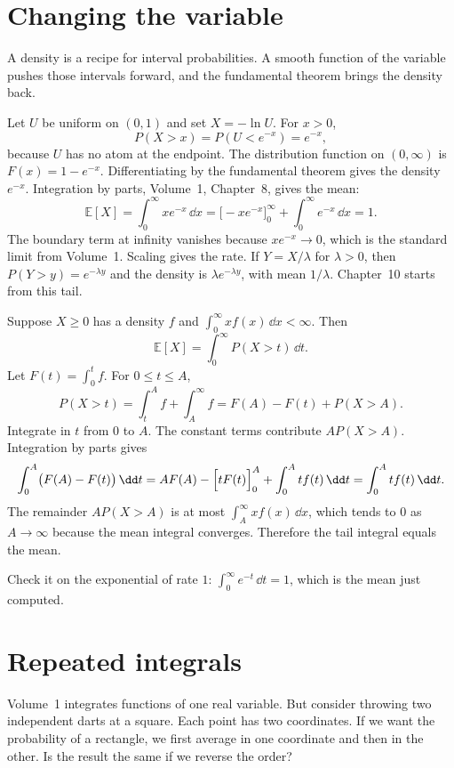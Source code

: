 \section{Changing the variable}

A density is a recipe for interval probabilities. A smooth function of the variable pushes those intervals forward, and the fundamental theorem brings the density back.

\begin{examplex}
Let $U$ be uniform on $(0,1)$ and set $X=-\ln U$. For $x>0$,
\[
 P(X>x)=P(U<e^{-x})=e^{-x},
\]
because $U$ has no atom at the endpoint. The distribution function on $(0,\infty)$ is $F(x)=1-e^{-x}$. Differentiating by the fundamental theorem gives the density $e^{-x}$. Integration by parts, Volume~1, Chapter~8, gives the mean:
\[
 \mathbb E[X]=\int_0^{\infty} x e^{-x}\,\dd x=\bigl[-xe^{-x}\bigr]_0^{\infty}+\int_0^{\infty}e^{-x}\,\dd x=1.
\]
The boundary term at infinity vanishes because $x e^{-x}\to0$, which is the standard limit from Volume~1. Scaling gives the rate. If $Y=X/\lambda$ for $\lambda>0$, then $P(Y>y)=e^{-\lambda y}$ and the density is $\lambda e^{-\lambda y}$, with mean $1/\lambda$. Chapter~10 starts from this tail.
\end{examplex}

\begin{examplex}
Suppose $X\ge0$ has a density $f$ and $\int_0^{\infty} x f(x)\,\dd x<\infty$. Then
\[
 \mathbb E[X]=\int_0^{\infty} P(X>t)\,\dd t.
\]
Let $F(t)=\int_0^t f$. For $0\le t\le A$,
\[
 P(X>t)=\int_t^A f+\int_A^{\infty} f=F(A)-F(t)+P(X>A).
\]
Integrate in $t$ from $0$ to $A$. The constant terms contribute $A P(X>A)$. Integration by parts gives
\[
 \int_0^A\bigl(F(A)-F(t)\bigr)\,\dd t=A F(A)-\Bigl[t F(t)\Bigr]_0^A+\int_0^A t f(t)\,\dd t=\int_0^A t f(t)\,\dd t.
\]
The remainder $A P(X>A)$ is at most $\int_A^{\infty} x f(x)\,\dd x$, which tends to $0$ as $A\to\infty$ because the mean integral converges. Therefore the tail integral equals the mean.

Check it on the exponential of rate $1$: $\int_0^{\infty} e^{-t}\,\dd t=1$, which is the mean just computed.
\end{examplex}

\section{Repeated integrals}

Volume~1 integrates functions of one real variable. But consider throwing two independent darts at a square. Each point has two coordinates. If we want the probability of a rectangle, we first average in one coordinate and then in the other. Is the result the same if we reverse the order?


